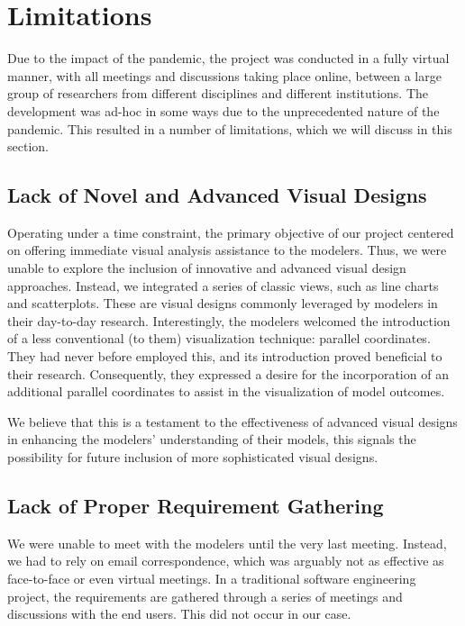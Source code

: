 \section{Limitations}

Due to the impact of the pandemic, the project was conducted in a fully virtual manner, with all meetings and discussions taking place online, between a large group of researchers from different disciplines and different institutions.
The development was ad-hoc in some ways due to the unprecedented nature of the pandemic.
This resulted in a number of limitations, which we will discuss in this section.

\subsection{Lack of Novel and Advanced Visual Designs}
Operating under a time constraint, the primary objective of our project centered on offering immediate visual analysis assistance to the modelers.
Thus, we were unable to explore the inclusion of innovative and advanced visual design approaches.
Instead, we integrated a series of classic views, such as line charts and scatterplots.
These are visual designs commonly leveraged by modelers in their day-to-day research.
Interestingly, the modelers welcomed the introduction of a less conventional (to them) visualization technique: parallel coordinates.
They had never before employed this, and its introduction proved beneficial to their research.
Consequently, they expressed a desire for the incorporation of an additional parallel coordinates to assist in the visualization of model outcomes.

We believe that this is a testament to the effectiveness of advanced visual designs in enhancing the modelers' understanding of their models, this signals the possibility for future inclusion of more sophisticated visual designs.

\subsection{Lack of Proper Requirement Gathering}
We were unable to meet with the modelers until the very last meeting. Instead, we had to rely on email correspondence, which was arguably not as effective as face-to-face or even virtual meetings.
In a traditional software engineering project, the requirements are gathered through a series of meetings and discussions with the end users. This did not occur in our case.

